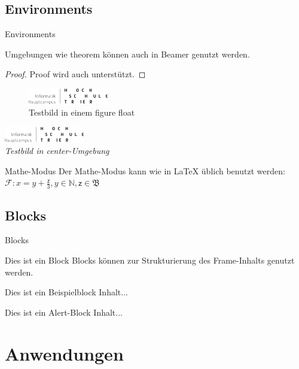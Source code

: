 \documentclass[t,aspectratio=169,dvipsnames]{beamer}
\begin{document}
\subsection{Environments}
\begin{frame}{Environments}
\begin{theorem}
	Umgebungen wie theorem können auch in Beamer genutzt werden.
\end{theorem}
\begin{proof}
	Proof wird auch unterstützt.
\end{proof}
\begin{figure}
	\includegraphics[width=3.5cm]{HochschuleLogo}
	\caption{Testbild in einem figure float}
\end{figure}
\begin{center}
	\includegraphics[width=3.5cm]{HochschuleLogo}\\
	\emph{Testbild in center-Umgebung}
\end{center}
\end{frame}

\begin{frame}{Mathe-Modus}
	Der Mathe-Modus kann wie in LaTeX üblich benutzt werden:\\ 
	$\mathcal{F}: x = y + \frac{\mathsf{z}}{3}, y \in \mathbb{N}, \mathsf{z} \in \mathfrak{B}$ 
\end{frame}

\subsection{Blocks}
\begin{frame}{Blocks}
\begin{block}{Dies ist ein Block}
	Blocks können zur Strukturierung des Frame-Inhalts genutzt werden.
\end{block}
\begin{exampleblock}{Dies ist ein Beispielblock}
	Inhalt...
\end{exampleblock}
\begin{alertblock}{Dies ist ein Alert-Block}
	Inhalt...
\end{alertblock}
\end{frame}

\section{Anwendungen}
\end{document}
